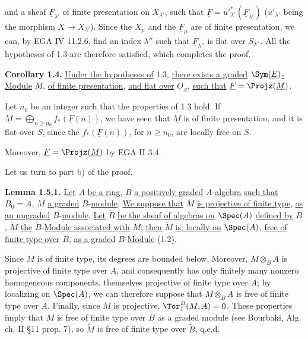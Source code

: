 %
and a sheaf \(\underline{F}_{\lambda'}\) of finite presentation on \(X_{\lambda'}\), such that \(\underline{F}=u'^*_{\lambda'}(\underline{F}_{\lambda'})\) (\(u'_{\lambda'}\) being the morphism \(X\to X_{\lambda'}\)). Since the \(X_\mu\) and the \(\underline{F}_\mu\) are of finite presentation, we can, by EGA IV 11.2.6, find an index \(\lambda''\) such that \(\underline{F}_{\lambda''}\) is flat over \(S_{\lambda''}\). All the hypotheses of 1.3 are therefore satisfied, which completes the proof.

\textbf{Corollary 1.4.} \uline{Under the hypotheses of} 1.3, \uline{there exists a graded} \(\Sym(\underline{E})\)\uline{-Module} \(\underline{M}\), \uline{of finite presentation}, \uline{and flat over} \(\underline{O}_S\), \uline{such that} \(\underline{F}=\Projz(\underline{M})\).

Let \(n_0\) be an integer such that the properties of 1.3 hold. If \(\underline{M}=\bigoplus_{n\geq n_0} f_*(\underline{F}(n))\), we have seen that \(\underline{M}\) is of finite presentation, and it is flat over \(S\), since the \(f_*(\underline{F}(n))\), for \(n\geq n_0\), are locally free on \(S\).

Moreover, \(\underline{F}=\Projz(\underline{M})\) by EGA II 3.4.

Let us turn to part b) of the proof.

\textbf{Lemma 1.5.1.} \uline{Let} \(A\) \uline{be a ring}, \(B\) \uline{a positively graded} \(A\)-\uline{algebra} \uline{such that} \(B_0=A\), \(M\) \uline{a graded} \(B\)-\uline{module}. \uline{We suppose that} \(M\) \uline{is projective of finite type}, \uline{as an ungraded} \(B\)-\uline{module}. \uline{Let} \(\widetilde B\) \uline{be the sheaf of algebras on} \(\Spec(A)\) \uline{defined by} \(B\), \(\widetilde M\) \uline{the} \(\widetilde B\)-\uline{Module associated with} \(M\); \uline{then} \(\widetilde M\) \uline{is, locally on} \(\Spec(A)\), \uline{free of finite type over} \(\widetilde B\), \uline{as a graded} \(\widetilde B\)-\uline{Module} (1.2).

Since \(M\) is of finite type, its degrees are bounded below. Moreover, \(M\otimes_B A\) is projective of finite type over \(A\), and consequently has only finitely many nonzero homogeneous components, themselves projective of finite type over \(A\); by localizing on \(\Spec(A)\), we can therefore suppose that \(M\otimes_B A\) is free of finite type over \(A\). Finally, since \(M\) is projective, \(\Tor_1^B(M,A)=0\). These properties imply that \(M\) is free of finite type over \(B\) as a graded module (see Bourbaki, Alg. ch. II §11 prop. 7), so \(\widetilde M\) is free of finite type over \(\widetilde B\), q.e.d.

